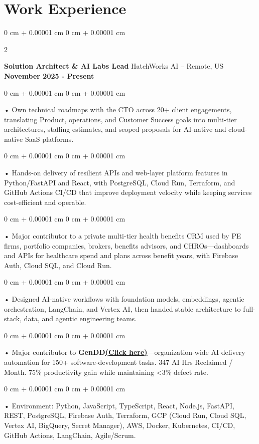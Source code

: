 \documentclass[10pt, letterpaper]{article}
\newenvironment{onecolentry}{
    \begin{adjustwidth}{
        0 cm + 0.00001 cm
    }{
        0 cm + 0.00001 cm
    }
}{
    \end{adjustwidth}
} %
\newenvironment{twocolentry}[2][]{
    \onecolentry
    \def\secondColumn{#2}
    \setcolumnwidth{\fill, 4.5 cm}
    \begin{paracol}{2}
}{
    \switchcolumn \raggedleft \secondColumn
    \end{paracol}
    \endonecolentry
} %
\begin{document}
    \vspace{0.5cm}
    \section{Work Experience}
        \vspace{0.1cm}

        \begin{twocolentry}{
            \textbf{November 2025 - Present}
        }
            \textbf{Solution Architect \& AI Labs Lead} HatchWorks AI -- Remote, US\end{twocolentry}

        \begin{onecolentry}
             • Own technical roadmaps with the CTO across 20+ client engagements, translating Product, operations, and Customer Success goals into multi-tier architectures, staffing estimates, and scoped proposals for AI-native and cloud-native SaaS platforms.
        \end{onecolentry}
        \begin{onecolentry}
             • Hands-on delivery of resilient APIs and web-layer platform features in Python/FastAPI and React, with PostgreSQL, Cloud Run, Terraform, and GitHub Actions CI/CD that improve deployment velocity while keeping services cost-efficient and operable.
        \end{onecolentry}
        \begin{onecolentry}
             • Major contributor to a private multi-tier health benefits CRM used by PE firms, portfolio companies, brokers, benefits advisors, and CHROs---dashboards and APIs for healthcare spend and plans across benefit years, with Firebase Auth, Cloud SQL, and Cloud Run.
        \end{onecolentry}
        \begin{onecolentry}
             • Designed AI-native workflows with foundation models, embeddings, agentic orchestration, LangChain, and Vertex AI, then handed stable architecture to full-stack, data, and agentic engineering teams.
        \end{onecolentry}
        \begin{onecolentry}
             • Major contributor to \textbf{GenDD}\href{https://hatchworks.com/generative-driven-development/}{\textbf{(Click here)}}---organization-wide AI delivery automation for 150+ software-development tasks. 347 AI Hrs Reclaimed / Month. 75\% productivity gain while maintaining {<}3\% defect rate.
        \end{onecolentry}
        \begin{onecolentry}
             • Environment: Python, JavaScript, TypeScript, React, Node.js, FastAPI, REST, PostgreSQL, Firebase Auth, Terraform, GCP (Cloud Run, Cloud SQL, Vertex AI, BigQuery, Secret Manager), AWS, Docker, Kubernetes, CI/CD, GitHub Actions, LangChain, Agile/Scrum.
        \end{onecolentry}
\end{document}
